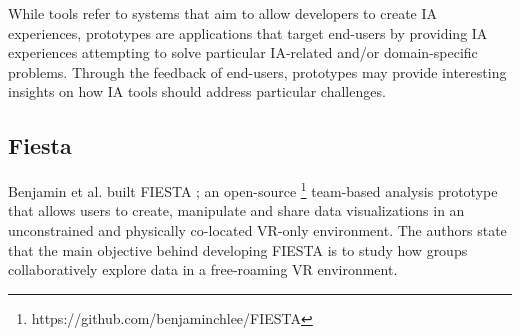 \documentclass{vgtc}                          %
\begin{document}
While tools refer to systems that aim to allow developers to create IA
experiences, prototypes are applications that target end-users by providing IA
experiences attempting to solve particular IA-related and/or domain-specific
problems. Through the feedback of end-users, prototypes may provide interesting
insights on how IA tools should address particular challenges.


\subsection{Fiesta}

\noindent Benjamin et al. built FIESTA \cite{fiesta_prototype}; an open-source
\footnote{https://github.com/benjaminchlee/FIESTA} team-based analysis
prototype that allows users to create, manipulate and share data visualizations
in an unconstrained and physically co-located VR-only environment. The authors
state that the main objective behind developing FIESTA is to study how groups
collaboratively explore data in a free-roaming VR environment.

\medskip
\end{document}
